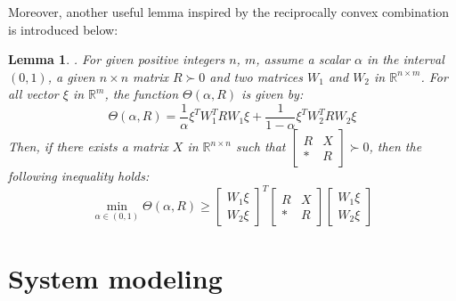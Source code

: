 \documentclass[a4paper]{cas-sc}
\newtheorem{lemma}[theorem]{Lemma}
\begin{document}
Moreover, another useful lemma inspired by the reciprocally convex combination is introduced below:
\begin{lemma}
  \label{lemma2}
  \citep{park_reciprocally_2011}. For given positive integers $n$, $m$, assume a scalar $\alpha$ in the interval $ (0,1) $, a given $ n \times n $ matrix $ R \succ 0 $ and two matrices $W_1$ and $W_2$ in $ {\mathbb{R}^{n \times m}} $. For all vector $ \xi  $ in $ {\mathbb{R}^m} $, the function $ \Theta (\alpha ,R) $ is given by:
  \begin{equation}
    \Theta (\alpha ,R) = \frac{1}{\alpha }{\xi ^T}W_1^TR{W_1}\xi  + \frac{1}{{1 - \alpha }}{\xi ^T}W_2^TR{W_2}\xi
    \label{eqlemma21}
  \end{equation}
  Then, if there exists a matrix $X$ in $ {\mathbb{R}^{n \times n}} $ such that $ \left[ {\begin{array}{*{20}{l}}
            R & X \\
            * & R
          \end{array}} \right] \succ 0 $, then the following inequality holds:
  \begin{equation}
    \mathop {\min }\limits_{\alpha  \in (0,1)} \Theta (\alpha ,R) \geqslant {\left[ {\begin{array}{*{20}{l}}
              {{W_1}\xi } \\
              {{W_2}\xi }
            \end{array}} \right]^T}\left[ {\begin{array}{*{20}{c}}
            R & X \\
            * & R
          \end{array}} \right]\left[ {\begin{array}{*{20}{l}}
            {{W_1}\xi } \\
            {{W_2}\xi }
          \end{array}} \right]
    \label{eqlemma22}
  \end{equation}
\end{lemma}



\section{System modeling}
\label{Section 3}
\end{document}
